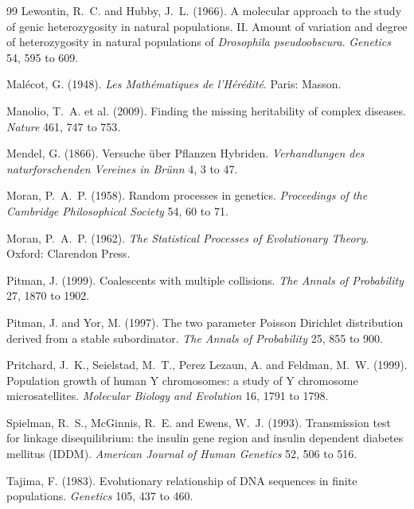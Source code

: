 \begin{thebibliography}{99}
Lewontin, R.~C. and Hubby, J.~L. (1966). A molecular approach to the study of genic heterozygosity
in natural populations. II. Amount of variation and degree of heterozygosity in natural populations of \emph{Drosophila pseudoobscura}. \emph{Genetics} 54, 595 to 609.

Mal\'ecot, G. (1948). \emph{Les Math\'ematiques de l'H\'er\'edit\'e}. Paris: Masson.

Manolio, T.~A. et al. (2009). Finding the missing heritability of complex diseases.
\emph{Nature} 461, 747 to 753.

Mendel, G. (1866). Versuche \"uber Pflanzen Hybriden. \emph{Verhandlungen des naturforschenden
Vereines in Br\"unn} 4, 3 to 47.

Moran, P.~A.~P. (1958). Random processes in genetics. \emph{Proceedings of the Cambridge
Philosophical Society} 54, 60 to 71.

Moran, P.~A.~P. (1962). \emph{The Statistical Processes of Evolutionary Theory}. Oxford: Clarendon
Press.

Pitman, J. (1999). Coalescents with multiple collisions. \emph{The Annals of Probability} 27, 1870
to 1902.

Pitman, J. and Yor, M. (1997). The two parameter Poisson Dirichlet distribution derived from a
stable subordinator. \emph{The Annals of Probability} 25, 855 to 900.

Pritchard, J.~K., Seielstad, M.~T., Perez Lezaun, A. and Feldman, M.~W. (1999). Population growth
of human Y chromosomes: a study of Y chromosome microsatellites. \emph{Molecular Biology and
Evolution} 16, 1791 to 1798.

Spielman, R.~S., McGinnis, R.~E. and Ewens, W.~J. (1993). Transmission test for linkage
disequilibrium: the insulin gene region and insulin dependent diabetes mellitus (IDDM).
\emph{American Journal of Human Genetics} 52, 506 to 516.

Tajima, F. (1983). Evolutionary relationship of DNA sequences in finite populations.
\emph{Genetics} 105, 437 to 460.


\end{thebibliography}
